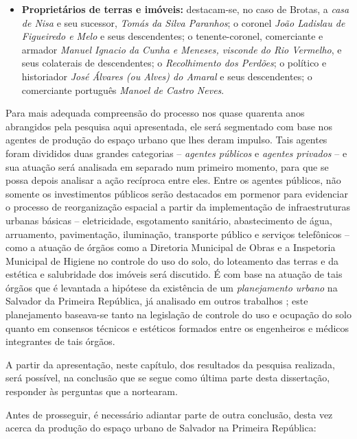 \begin{itemize}
\item \textbf{Proprietários de terras e imóveis:} destacam-se, no caso de Brotas, a \textit{casa de Nisa} e seu sucessor, \textit{Tomás da Silva Paranhos}; o coronel \textit{João Ladislau de Figueiredo e Melo} e seus descendentes; o tenente-coronel, comerciante e armador \textit{Manuel Ignacio da Cunha e Meneses, visconde do Rio Vermelho}, e seus colaterais de descendentes; o \textit{Recolhimento dos Perdões}; o político e historiador \textit{José Álvares (ou Alves) do Amaral} e seus descendentes; o comerciante português \textit{Manoel de Castro Neves}.
\end{itemize}

Para mais adequada compreensão do processo nos quase quarenta anos abrangidos pela pesquisa aqui apresentada, ele será segmentado com base nos agentes de produção do espaço urbano que lhes deram impulso. Tais agentes foram divididos duas grandes categorias -- \textit{agentes públicos} e \textit{agentes privados} -- e sua atuação será analisada em separado num primeiro momento, para que se possa depois analisar a ação recíproca entre eles. Entre os agentes públicos, não somente os investimentos públicos serão destacados em pormenor para evidenciar o processo de reorganização espacial a partir da implementação de infraestruturas urbanas básicas -- eletricidade, esgotamento sanitário, abastecimento de água, arruamento, pavimentação, iluminação, transporte público e serviços telefônicos -- como a atuação de órgãos como a Diretoria Municipal de Obras e a Inspetoria Municipal de Higiene no controle do uso do solo, do loteamento das terras e da estética e salubridade dos imóveis será discutido. É com base na atuação de tais órgãos que é levantada a hipótese da existência de um \textit{planejamento urbano} na Salvador da Primeira República, já analisado em outros trabalhos \cite{almeida_victoria_1997, almeida_vitrinescomercio_2014}; este planejamento baseava-se tanto na legislação de controle do uso e ocupação do solo quanto em consensos técnicos e estéticos formados entre os engenheiros e médicos integrantes de tais órgãos.

A partir da apresentação, neste capítulo, dos resultados da pesquisa realizada, será possível, na conclusão que se segue como última parte desta dissertação, responder às perguntas que a nortearam.

Antes de prosseguir, é necessário adiantar parte de outra conclusão, desta vez acerca da produção do espaço urbano de Salvador na Primeira República:

